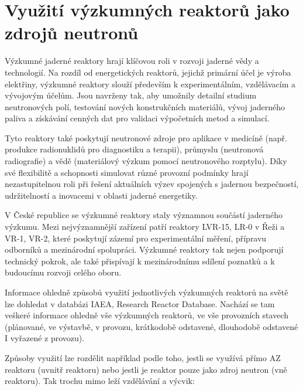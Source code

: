 \section[Využití výzkumných reaktorů]{Využití výzkumných reaktorů jako zdrojů neutronů}

Výzkumné jaderné reaktory hrají klíčovou roli v rozvoji jaderné vědy a technologií. Na rozdíl od energetických reaktorů, jejichž primární účel je výroba elektřiny, výzkumné reaktory slouží především k experimentálním, vzdělávacím a vývojovým účelům. Jsou navrženy tak, aby umožnily detailní studium neutronových polí, testování nových konstrukčních materiálů, vývoj jaderného paliva a získávání cenných dat pro validaci výpočetních metod a simulací.

Tyto reaktory také poskytují neutronové zdroje pro aplikace v medicíně (např. produkce radionuklidů pro diagnostiku a terapii), průmyslu (neutronová radiografie) a vědě (materiálový výzkum pomocí neutronového rozptylu). Díky své flexibilitě a schopnosti simulovat různé provozní podmínky hrají nezastupitelnou roli při řešení aktuálních výzev spojených s jadernou bezpečností, udržitelností a inovacemi v oblasti jaderné energetiky.

V České republice se výzkumné reaktory staly významnou součástí jaderného výzkumu. Mezi nejvýznamnější zařízení patří reaktory LVR-15, LR-0 v Řeži a VR-1, VR-2, které poskytují zázemí pro experimentální měření, přípravu odborníků a mezinárodní spolupráci. Výzkumné reaktory tak nejen podporují technický pokrok, ale také přispívají k mezinárodnímu sdílení poznatků a k budoucímu rozvoji celého oboru.

Informace ohledně způsobů využití jednotlivých výzkumných reaktorů na světě lze dohledat v databázi IAEA, Research Reactor Database. Nachází se tam veškeré informace ohledně vše výzkumných reaktorů, ve vše provozních stavech (plánované, ve výstavbě, v provozu, krátkodobě odstavené, dlouhodobě odstavené I vyřazené z provozu). 

Způsoby využití lze rozdělit například podle toho, jestli se využívá přímo AZ reaktoru (uvnitř reaktoru) nebo jestli je reaktor pouze jako zdroj neutron (vně reaktoru). Tak trochu mimo leží vzdělávání a výcvik:

